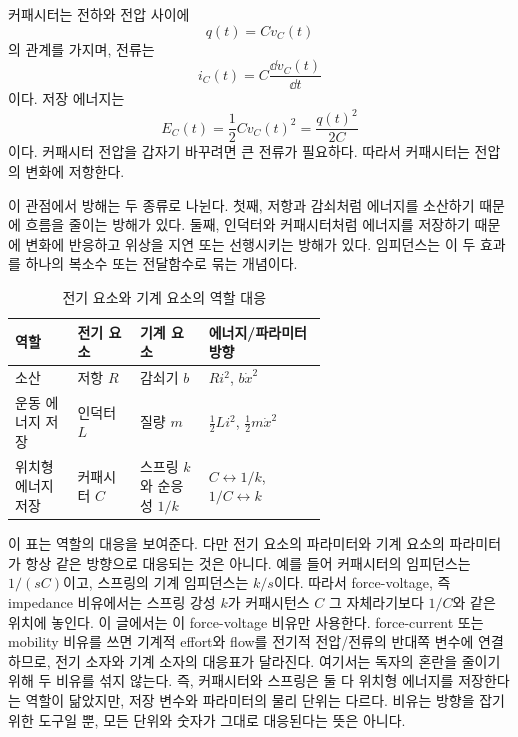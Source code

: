 커패시터는 전하와 전압 사이에
\begin{equation}
  q(t) = C v_C(t)
\end{equation}
의 관계를 가지며, 전류는
\begin{equation}
  i_C(t) = C\frac{\dd v_C(t)}{\dd t}
\end{equation}
이다.
저장 에너지는
\begin{equation}
  E_C(t) = \frac{1}{2}C v_C(t)^2 = \frac{q(t)^2}{2C}
\end{equation}
이다.
커패시터 전압을 갑자기 바꾸려면 큰 전류가 필요하다.
따라서 커패시터는 전압의 변화에 저항한다.

이 관점에서 방해는 두 종류로 나뉜다.
첫째, 저항과 감쇠처럼 에너지를 소산하기 때문에 흐름을 줄이는 방해가 있다.
둘째, 인덕터와 커패시터처럼 에너지를 저장하기 때문에 변화에 반응하고 위상을 지연 또는 선행시키는 방해가 있다.
임피던스는 이 두 효과를 하나의 복소수 또는 전달함수로 묶는 개념이다.

\begin{table}[!htbp]
  \centering
  \caption{전기 요소와 기계 요소의 역할 대응}
  \begin{tabularx}{\linewidth}{@{}>{\raggedright\arraybackslash}p{0.20\linewidth}>{\raggedright\arraybackslash}p{0.20\linewidth}>{\raggedright\arraybackslash}p{0.22\linewidth}>{\raggedright\arraybackslash}X@{}}
    \toprule
    역할 & 전기 요소 & 기계 요소 & 에너지/파라미터 방향 \\
    \midrule
    소산 & 저항 $R$ & 감쇠기 $b$ & $R i^2$, $b\dot{x}^2$ \\
    운동 에너지 저장 & 인덕터 $L$ & 질량 $m$ & $\frac{1}{2}Li^2$, $\frac{1}{2}m\dot{x}^2$ \\
    위치형 에너지 저장 & 커패시터 $C$ & 스프링 $k$와 순응성 $1/k$ & $C\leftrightarrow 1/k$, $1/C\leftrightarrow k$ \\
    \bottomrule
  \end{tabularx}
\end{table}

이 표는 역할의 대응을 보여준다.
다만 전기 요소의 파라미터와 기계 요소의 파라미터가 항상 같은 방향으로 대응되는 것은 아니다.
예를 들어 커패시터의 임피던스는 $1/(sC)$이고, 스프링의 기계 임피던스는 $k/s$이다.
따라서 force-voltage, 즉 impedance 비유에서는 스프링 강성 $k$가 커패시턴스 $C$ 그 자체라기보다 $1/C$와 같은 위치에 놓인다.
이 글에서는 이 force-voltage 비유만 사용한다.
force-current 또는 mobility 비유를 쓰면 기계적 effort와 flow를 전기적 전압/전류의 반대쪽 변수에 연결하므로, 전기 소자와 기계 소자의 대응표가 달라진다.
여기서는 독자의 혼란을 줄이기 위해 두 비유를 섞지 않는다.
즉, 커패시터와 스프링은 둘 다 위치형 에너지를 저장한다는 역할이 닮았지만, 저장 변수와 파라미터의 물리 단위는 다르다.
비유는 방향을 잡기 위한 도구일 뿐, 모든 단위와 숫자가 그대로 대응된다는 뜻은 아니다.

